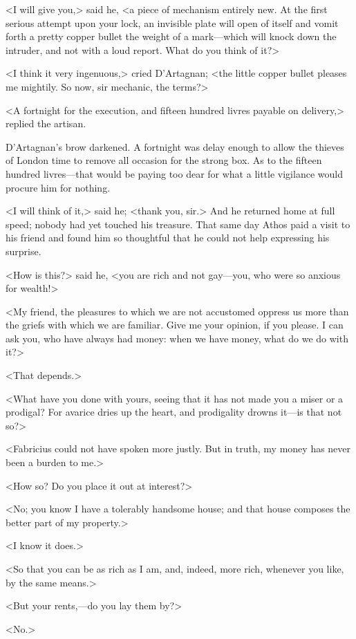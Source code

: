<I will give you,> said he, <a piece of mechanism entirely new. At the first serious attempt upon your lock, an invisible plate will open of itself and vomit forth a pretty copper bullet the weight of a mark—which will knock down the intruder, and not with a loud report. What do you think of it?>

<I think it very ingenuous,> cried D'Artagnan; <the little copper bullet pleases me mightily. So now, sir mechanic, the terms?>

<A fortnight for the execution, and fifteen hundred livres payable on delivery,> replied the artisan.

D'Artagnan's brow darkened. A fortnight was delay enough to allow the thieves of London time to remove all occasion for the strong box. As to the fifteen hundred livres—that would be paying too dear for what a little vigilance would procure him for nothing.

<I will think of it,> said he; <thank you, sir.> And he returned home at full speed; nobody had yet touched his treasure. That same day Athos paid a visit to his friend and found him so thoughtful that he could not help expressing his surprise.

<How is this?> said he, <you are rich and not gay—you, who were so anxious for wealth!>

<My friend, the pleasures to which we are not accustomed oppress us more than the griefs with which we are familiar. Give me your opinion, if you please. I can ask you, who have always had money: when we have money, what do we do with it?>

<That depends.>

<What have you done with yours, seeing that it has not made you a miser or a prodigal? For avarice dries up the heart, and prodigality drowns it—is that not so?>

<Fabricius could not have spoken more justly. But in truth, my money has never been a burden to me.>

<How so? Do you place it out at interest?>

<No; you know I have a tolerably handsome house; and that house composes the better part of my property.>

<I know it does.>

<So that you can be as rich as I am, and, indeed, more rich, whenever you like, by the same means.>

<But your rents,—do you lay them by?>

<No.>

